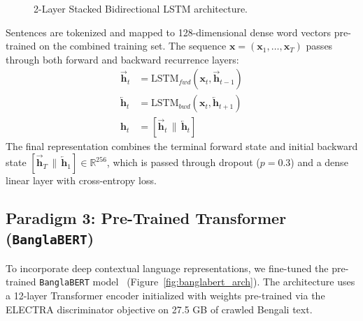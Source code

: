\documentclass[11pt,a4paper]{article}
\begin{document}
\begin{figure}[htbp]
{%
}
\caption{2-Layer Stacked Bidirectional LSTM architecture.}
\label{fig:bilstm_arch}
\end{figure}

Sentences are tokenized and mapped to 128-dimensional dense word vectors pre-trained on the combined training set. The sequence $\mathbf{x} = (\mathbf{x}_1, \dots, \mathbf{x}_T)$ passes through both forward and backward recurrence layers:
\begin{align}
\overrightarrow{\mathbf{h}}_t &= \text{LSTM}_{fwd}(\mathbf{x}_t, \overrightarrow{\mathbf{h}}_{t-1}) \\
\overleftarrow{\mathbf{h}}_t &= \text{LSTM}_{bwd}(\mathbf{x}_t, \overleftarrow{\mathbf{h}}_{t+1}) \\
\mathbf{h}_t &= [\overrightarrow{\mathbf{h}}_t \,\|\, \overleftarrow{\mathbf{h}}_t]
\end{align}
The final representation combines the terminal forward state and initial backward state $[\overrightarrow{\mathbf{h}}_T \,\|\, \overleftarrow{\mathbf{h}}_1] \in \mathbb{R}^{256}$, which is passed through dropout ($p=0.3$) and a dense linear layer with cross-entropy loss.

\subsection{Paradigm 3: Pre-Trained Transformer (\texttt{BanglaBERT})}
To incorporate deep contextual language representations, we fine-tuned the pre-trained \texttt{BanglaBERT} model~\cite{alam2021banglabert} (Figure~\ref{fig:banglabert_arch}). The architecture uses a 12-layer Transformer encoder initialized with weights pre-trained via the ELECTRA discriminator objective on 27.5 GB of crawled Bengali text.
\end{document}
